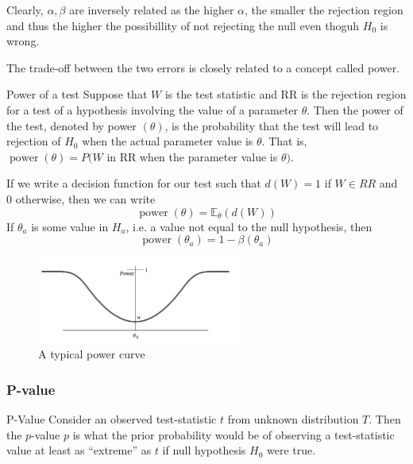 \documentclass[11pt, %
	oneside, %
	english, %
	onehalfspacing, %
	]{article} %
\numberwithin{equation}{section}
\begin{document}
Clearly, $\alpha, \beta$ are inversely related as the higher $\alpha$, the smaller the rejection region and thus the higher the possibillity of not rejecting the null even thoguh $H_0$ is wrong.

The trade-off between the two errors is closely related to a concept called power.

\begin{definition}{Power of a test}{}
    Suppose that $W$ is the test statistic and RR is the rejection region for a test of a hypothesis involving the value of a parameter $\theta$. Then the power of the test, denoted by power $(\theta)$, is the probability that the test will lead to rejection of $H_0$ when the actual parameter value is $\theta$. That is, $\operatorname{power}(\theta)=P(W$ in RR when the parameter value is $\theta)$.
\end{definition}

If we write a decision function for our test such that $d(W) = 1$ if $W \in RR$ and $0$ otherwise, then we can write
\begin{equation}\label{eq.power.decfn}
    \operatorname{power}(\theta)= \mathbb{E}_\theta (d(W))
\end{equation}
If $\theta_a$ is some value in $H_a$, i.e. a value not equal to the null hypothesis, then
\begin{equation*}
    \operatorname{power}\left(\theta_a\right)=1-\beta\left(\theta_a\right)
\end{equation*}


\begin{figure}
    \caption{A typical power curve}
    \begin{center}
        \includegraphics[width = 0.6\textwidth]{powercurve.png}
    \end{center}
\end{figure}


\subsubsection*{P-value}

\begin{definition}{P-Value}{}
    Consider an observed test-statistic $t$ from unknown distribution $T$. Then the $p$-value $p$ is what the prior probability would be of observing a test-statistic value at least as ``extreme'' as $t$ if null hypothesis $H_0$ were true.
\end{definition}
\end{document}

